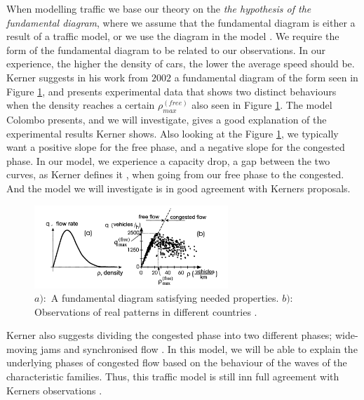 \documentclass[10pt]{article}
\numberwithin{equation}{section}
\begin{document}
When modelling traffic we base our theory on the \textit{the hypothesis of the fundamental diagram}, where we assume that the fundamental diagram is either a result of a traffic model, or we use the diagram in the model \cite[p.~254]{KernerHelbing}. We require the form of the fundamental diagram to be related to our observations. In our experience, the higher the density of cars, the lower the average speed should be. Kerner suggests in his work from $2002$ \cite{KernerHelbing} a fundamental diagram of the form seen in Figure \ref{fig:Kerner}, and presents experimental data that shows two distinct behaviours when the density reaches a certain $\rho_{max}^{(free)}$ also seen in Figure \ref{fig:Kerner}. The model Colombo presents, and we will investigate, gives a good explanation of the experimental results Kerner shows. Also looking at the Figure \ref{fig:Kerner}, we typically want a positive slope for the free phase, and a negative slope for the congested phase. In our model, we experience a capacity drop, a gap between the two curves, as Kerner defines it \cite[p.~254]{KernerHelbing}, when going from our free phase to the congested. And the model we will investigate is in good agreement with Kerners proposals. 
\begin{figure}[H]
    \centering
    \includegraphics[width=0.65\textwidth]{Figures/Model/Kerner.png}
    \caption{$a):$ A fundamental diagram satisfying needed properties. $b):$ Observations of real patterns in different countries \cite{KernerHelbing}. }
    \label{fig:Kerner}
\end{figure} Kerner also suggests dividing the congested phase into two different phases; wide-moving jams and synchronised flow \cite[p.~256]{KernerHelbing}. In this model, we will be able to explain the underlying phases of congested flow based on the behaviour of the waves of the characteristic families. Thus, this traffic model is still inn full agreement with Kerners observations \cite{Colombo2003}.
\end{document}
